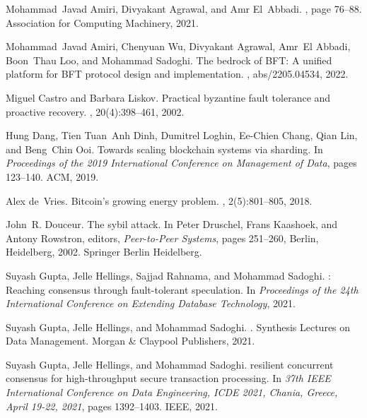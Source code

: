 \documentclass[11pt]{article}
\begin{document}
\begin{thebibliography}{10}

Mohammad~Javad Amiri, Divyakant Agrawal, and Amr El~Abbadi.
, page 76–88.
\newblock Association for Computing Machinery, 2021.

Mohammad~Javad Amiri, Chenyuan Wu, Divyakant Agrawal, Amr~El Abbadi, Boon~Thau
  Loo, and Mohammad Sadoghi.
\newblock The bedrock of {BFT:} {A} unified platform for {BFT} protocol design
  and implementation.
, abs/2205.04534, 2022.

Miguel Castro and Barbara Liskov.
\newblock Practical byzantine fault tolerance and proactive recovery.
, 20(4):398--461, 2002.

Hung Dang, Tien Tuan~Anh Dinh, Dumitrel Loghin, Ee-Chien Chang, Qian Lin, and
  Beng~Chin Ooi.
\newblock Towards scaling blockchain systems via sharding.
\newblock In {\em Proceedings of the 2019 International Conference on
  Management of Data}, pages 123--140. ACM, 2019.

Alex de~Vries.
\newblock Bitcoin's growing energy problem.
, 2(5):801--805, 2018.

John~R. Douceur.
\newblock The sybil attack.
\newblock In Peter Druschel, Frans Kaashoek, and Antony Rowstron, editors, {\em
  Peer-to-Peer Systems}, pages 251--260, Berlin, Heidelberg, 2002. Springer
  Berlin Heidelberg.

Suyash Gupta, Jelle Hellings, Sajjad Rahnama, and Mohammad Sadoghi.
: Reaching consensus through fault-tolerant
  speculation.
\newblock In {\em Proceedings of the 24th International Conference on Extending
  Database Technology}, 2021.

Suyash Gupta, Jelle Hellings, and Mohammad Sadoghi.
.
\newblock Synthesis Lectures on Data Management. Morgan {\&} Claypool
  Publishers, 2021.

Suyash Gupta, Jelle Hellings, and Mohammad Sadoghi.
 resilient concurrent consensus for high-throughput secure
  transaction processing.
\newblock In {\em 37th {IEEE} International Conference on Data Engineering,
  {ICDE} 2021, Chania, Greece, April 19-22, 2021}, pages 1392--1403. {IEEE},
  2021.


\end{thebibliography}
\end{document}
